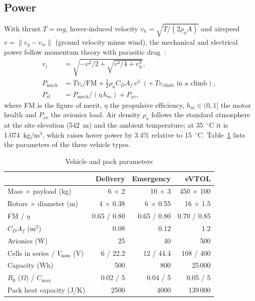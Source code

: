 \documentclass[journal]{IEEEtran}
\begin{document}
\subsection{Power}
With thrust $T = mg$, hover-induced velocity $v_h = \sqrt{T/(2\rho_a A)}$ and airspeed $v = \|v_g - v_w\|$ (ground velocity minus wind), the mechanical and electrical power follow momentum theory with parasitic drag~\cite{leishman2006principles}:
\begin{align}
v_i &= \sqrt{-v^2/2 + \sqrt{v^4/4 + v_h^4}},\\
P_{\mathrm{mech}} &= T v_i / \mathrm{FM} + \tfrac{1}{2}\rho_a C_D A_f\, v^3 \;(+\, T v_{\mathrm{climb}} \text{ in a climb}),\\
P_{\mathrm{el}} &= P_{\mathrm{mech}}/(\eta\, h_m) + P_{\mathrm{av}},
\end{align}
where FM is the figure of merit, $\eta$ the propulsive efficiency, $h_m \in (0,1]$ the motor health and $P_{\mathrm{av}}$ the avionics load. Air density $\rho_a$ follows the standard atmosphere at the site elevation (542~m) and the ambient temperature; at 35~$^\circ$C it is 1.074~kg/m$^3$, which raises hover power by 3.4\% relative to 15~$^\circ$C. Table~\ref{tab:vehicles} lists the parameters of the three vehicle types.

\begin{table}[t]
\centering
\caption{Vehicle and pack parameters}
\label{tab:vehicles}
\footnotesize
\setlength{\tabcolsep}{3pt}
\begin{tabular}{@{}lrrr@{}}
\toprule
 & Delivery & Emergency & eVTOL \\
\midrule
Mass + payload (kg) & 6 + 2 & 10 + 3 & 450 + 100 \\
Rotors $\times$ diameter (m) & 4 $\times$ 0.38 & 6 $\times$ 0.55 & 16 $\times$ 1.5 \\
FM / $\eta$ & 0.65 / 0.80 & 0.65 / 0.80 & 0.70 / 0.85 \\
$C_D A_f$ (m$^2$) & 0.08 & 0.12 & 1.2 \\
Avionics (W) & 25 & 40 & 500 \\
Cells in series / $V_{\mathrm{nom}}$ (V) & 6 / 22.2 & 12 / 44.4 & 108 / 400 \\
Capacity (Wh) & 500 & 800 & 25\,000 \\
$R_0$ ($\Omega$) / $C_{\max}$ & 0.02 / 5 & 0.04 / 5 & 0.05 / 5 \\
Pack heat capacity (J/K) & 2500 & 4000 & 139\,000 \\
\bottomrule
\end{tabular}
\end{table}
\end{document}

